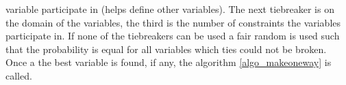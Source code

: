 variable participate in (helps define other variables). The next tiebreaker is on the domain of the variables, the 
third is the number of constraints the variables participate in. If none of the tiebreakers can be used a fair random 
is used such that the probability is equal for all variables which ties could not be broken. \\ 
Once a the best variable is found, if any, the algorithm \ref{algo_makeoneway}  \makeOneway is called.







